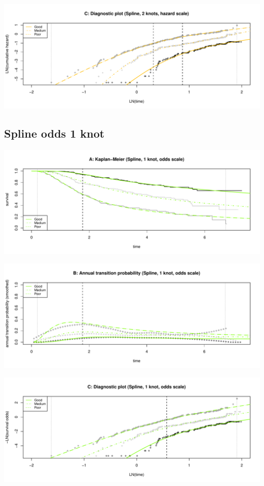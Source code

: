 \documentclass[]{article}
\begin{document}
\begin{flushleft}\includegraphics[height=0.3\textheight]{images/spline_hazard2-3} \end{flushleft}

\subsection{Spline odds 1 knot}\label{spline-odds-1-knot}

\begin{flushleft}\includegraphics[height=0.3\textheight]{images/spline_odds1-1} \end{flushleft}

\begin{flushleft}\includegraphics[height=0.3\textheight]{images/spline_odds1-2} \end{flushleft}

\begin{flushleft}\includegraphics[height=0.3\textheight]{images/spline_odds1-3} \end{flushleft}
\end{document}
